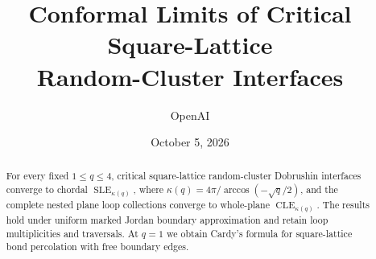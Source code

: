 \documentclass[11pt,a4paper]{article}
\title{Conformal Limits of Critical Square-Lattice\texorpdfstring{\\}{ }Random-Cluster Interfaces}
\author{OpenAI}
\date{October 5, 2026}
\numberwithin{equation}{section}
\theoremstyle{definition}
\theoremstyle{remark}
\newcommand{\SLE}{\operatorname{SLE}}
\newcommand{\CLE}{\operatorname{CLE}}
\begin{document}
\maketitle
\begin{abstract}
For every fixed $1\le q\le4$, critical square-lattice random-cluster
Dobrushin interfaces converge to chordal $\SLE_{\kappa(q)}$, where
$\kappa(q)=4\pi/\arccos(-\sqrt q/2)$, and the complete nested plane
loop collections converge to whole-plane $\CLE_{\kappa(q)}$.
The results hold under uniform marked Jordan boundary approximation and
retain loop multiplicities and traversals. At $q=1$ we obtain Cardy's
formula for square-lattice bond percolation with free boundary edges.
\end{abstract}
\tableofcontents










\clearpage
{}
{}

\end{document}
